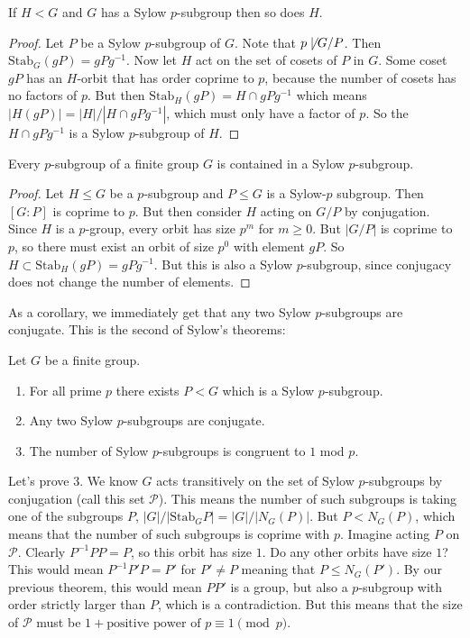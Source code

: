 \begin{lemma}
    If $H < G$ and $G$ has a Sylow $p$-subgroup then so does $H$.
    \begin{proof}
        Let $P$ be a Sylow $p$-subgroup of $G$. Note that $p \not \mid G/P$. Then $\text{Stab}_G(g P) = gPg^{-1}$.
        Now let $H$ act on the set of cosets of $P$ in $G$. Some coset $gP$ has an $H$-orbit
        that has order coprime to $p$, because the number of cosets has no factors of $p$. But then $\text{Stab}_H(gP) = H \cap gPg^{-1}$
        which means $|H(gP)| = |H|/|H \cap gPg^{-1}|$, which must only have a factor of $p$. So the $H \cap gPg^{-1}$ is a Sylow $p$-subgroup of $H$.
    \end{proof}
\end{lemma}

\begin{theorem}
Every $p$-subgroup of a finite group $G$ is contained in a Sylow $p$-subgroup.
\begin{proof}
    Let $H \le G$ be a $p$-subgroup and $P \le G$ is a Sylow-$p$ subgroup.
    Then $[G: P]$ is coprime to $p$. But then consider $H$ acting on $G/P$ by conjugation.
    Since $H$ is a $p$-group, every orbit has size $p^m$ for $m \ge 0$. But $|G/P|$
    is coprime to $p$, so there must exist an orbit of size $p^0$ with element $gP$. So $H \subset \text{Stab}_H (gP) = gPg^{-1}$.
    But this is also a Sylow $p$-subgroup, since conjugacy does not change the number of elements.
\end{proof}
\end{theorem}

As a corollary, we immediately get that any two Sylow $p$-subgroups are conjugate. This is the second of Sylow's theorems:
\begin{theorem}
    Let $G$ be a finite group.
    \begin{enumerate}
        \item For all prime $p$ there exists $P < G$ which is a Sylow $p$-subgroup.
        \item Any two Sylow $p$-subgroups are conjugate.
        \item The number of Sylow $p$-subgroups is congruent to $1$ mod $p$.
    \end{enumerate}
\end{theorem}

Let's prove 3. We know $G$ acts transitively on 
the set of Sylow $p$-subgroups by conjugation (call this set $\mathcal{P}$).
This means the number of such subgroups is 
taking one of the subgroups $P$, $|G|/|\text{Stab}_G P| = |G|/|N_G(P)|$.
But $P < N_G(P)$, which means that the 
number of such subgroups is coprime with $p$. Imagine acting $P$
on $\mathcal{P}$. Clearly $P^{-1} P P = P$, so 
this orbit has size $1$. Do any other orbits have size $1$?
This would mean $P^{-1} P' P = P'$ for $P' \neq P$ meaning that $P \le N_G(P')$. 
By our previous theorem, this would mean $P P'$ is a
group, but also a $p$-subgroup with order 
strictly larger than $P$, which is a contradiction.
But this means that the size of $\mathcal{P}$ must be $1 + \text{positive power of } p \equiv 1 \pmod{p}$.

